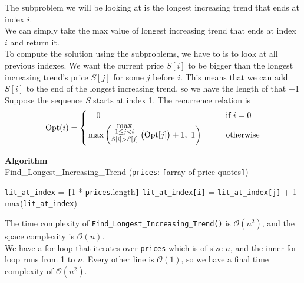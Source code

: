 \documentclass[12pt]{article}
\begin{document}
The subproblem we will be looking at is the longest increasing trend that ends at index $i$.\\
We can simply take the max value of longest increasing trend that ends at index $i$ and return it.\\

To compute the solution using the subproblems, we have to is to look at all previous indexes.
We want the current price $S[i]$ to be bigger than the longest increasing trend's price $S[j]$ for some $j$ before $i$.
This means that we can add $S[i]$ to the end of the longest increasing trend, so we have the length of that +1\\

Suppose the sequence $S$ starts at index 1. The recurrence relation is
$$
	\text{Opt}(i) =
	\left\{\begin{aligned}
		 & \hspace*{4.0mm} 0                                                                                                             &  & \hspace*{2em}\text{if } i = 0 \\
		 & \max\left(\raisebox{4mm}{$\underset{S[i] > S[j]}{\underset{1\leq j< i}{\text{max}}}$}\ \big(\text{Opt}[j]\big) + 1,\ 1\right) &  & \hspace*{2em}\text{otherwise} \\
	\end{aligned}\right.
$$

\begin{algorithm}
	\caption*{\textbf{Algorithm}\\Find\_Longest\_Increasing\_Trend \big(\texttt{prices}: \texttt{[}array of price quotes\texttt{]}\big)}\label{alg:cap}
	\begin{algorithmic}[1]
	\State \texttt{lit\_at\_index} = \texttt{[}1 * \texttt{prices}.length\texttt{]}
	\State
		\State\texttt{lit\_at\_index[i]} = \texttt{lit\_at\_index[j]} + 1
		\EndIf
		\EndFor
	\EndFor
	\State
	\State\Return max(\texttt{lit\_at\_index})
	\end{algorithmic}
\end{algorithm}

The time complexity of \texttt{Find\_Longest\_Increasing\_Trend()} is $\mathcal{O}(n^2)$, and the space complexity is $\mathcal{O}(n)$.\\
We have a for loop that iterates over \texttt{prices} which is of size $n$, and the inner for loop runs from 1 to $n$.
Every other line is $\mathcal{O}(1)$, so we have a final time complexity of $\mathcal{O}(n^2)$.\\
\end{document}
